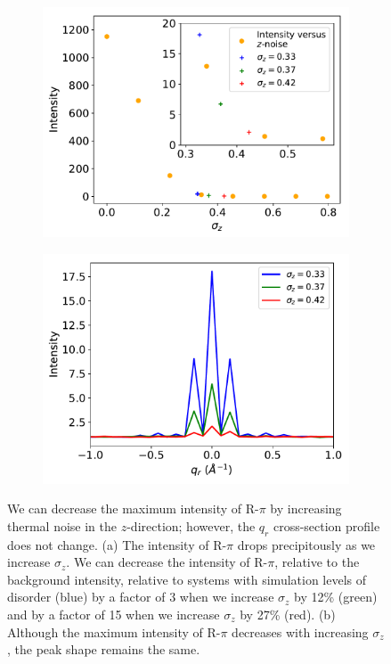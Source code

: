 \documentclass[journal=jpcbfk,manuscript=article]{achemso}
\begin{document}
  \begin{figure}[!htb]
  \centering
  \begin{subfigure}{0.49\textwidth}
  \includegraphics[width=\textwidth]{intensity_vs_zsigma.pdf}
  \caption{}\label{fig:intensity_vs_zsigma}
  \end{subfigure}
  \begin{subfigure}{0.49\textwidth}
  \includegraphics[width=\textwidth]{rpi_xsection_vs_zsigma.pdf}
  \caption{}\label{fig:rpi_xsection_vs_zsigma}
  \end{subfigure}
  \caption{We can decrease the maximum intensity of R-$\pi$ by increasing
  thermal noise in the $z$-direction; however, the $q_r$ cross-section profile does
  not change. (a) The intensity of R-$\pi$ drops precipitously as we increase
  $\sigma_z$. We can decrease the intensity of R-$\pi$, relative to the
  background intensity, relative to systems with simulation levels of disorder (blue)
  by a factor of 3 when we increase $\sigma_z$ by 12\% (green) and by a factor 
  of 15 when we increase $\sigma_z$ by 27\% (red). (b) Although the maximum intensity of R-$\pi$
  decreases with increasing $\sigma_z$, the peak shape remains the same.}\label{fig:znoise}
  \end{figure}
  
\end{document}
